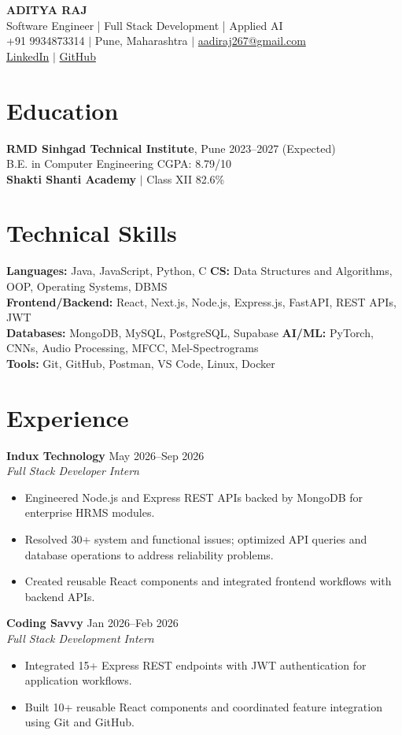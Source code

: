 \documentclass[10pt,letterpaper]{article}
\begin{document}
\begin{center}
{\LARGE\textbf{ADITYA RAJ}}\\[-1pt]
{\normalsize Software Engineer | Full Stack Development | Applied AI}\\[2pt]
+91 9934873314 $\mid$ Pune, Maharashtra $\mid$ \href{mailto:aadiraj267@gmail.com}{aadiraj267@gmail.com}\\[-1pt]
\href{https://www.linkedin.com/in/aditya-raj23/}{LinkedIn} $\mid$ \href{https://github.com/Adityaraj-r}{GitHub}
\end{center}
\vspace{-7pt}

\section*{Education}
\textbf{RMD Sinhgad Technical Institute}, Pune \hfill 2023--2027 (Expected)\\
B.E. in Computer Engineering \hfill CGPA: 8.79/10\\[-1pt]
\textbf{Shakti Shanti Academy} $\mid$ Class XII \hfill 82.6\%

\section*{Technical Skills}
\textbf{Languages:} Java, JavaScript, Python, C \quad
\textbf{CS:} Data Structures and Algorithms, OOP, Operating Systems, DBMS\\
\textbf{Frontend/Backend:} React, Next.js, Node.js, Express.js, FastAPI, REST APIs, JWT\\
\textbf{Databases:} MongoDB, MySQL, PostgreSQL, Supabase \quad
\textbf{AI/ML:} PyTorch, CNNs, Audio Processing, MFCC, Mel-Spectrograms\\
\textbf{Tools:} Git, GitHub, Postman, VS Code, Linux, Docker

\section*{Experience}
\textbf{Indux Technology} \hfill May 2026--Sep 2026\\
\textit{Full Stack Developer Intern}
\begin{itemize}
\item Engineered Node.js and Express REST APIs backed by MongoDB for enterprise HRMS modules.
\item Resolved 30+ system and functional issues; optimized API queries and database operations to address reliability problems.
\item Created reusable React components and integrated frontend workflows with backend APIs.
\end{itemize}
\textbf{Coding Savvy} \hfill Jan 2026--Feb 2026\\
\textit{Full Stack Development Intern}
\begin{itemize}
\item Integrated 15+ Express REST endpoints with JWT authentication for application workflows.
\item Built 10+ reusable React components and coordinated feature integration using Git and GitHub.
\end{itemize}
\end{document}
